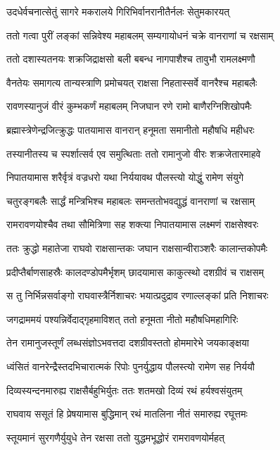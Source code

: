 \twolineshloka
{उदधेर्वचनात्सेतुं सागरे मकरालये}
{गिरिभिर्वानरानीतैर्नलः सेतुमकारयत्}%

\twolineshloka
{ततो गत्वा पुरीं लङ्कां सन्निवेश्य महाबलम्}
{सम्यगायोधनं चक्रे वानराणां च रक्षसाम्}%

\twolineshloka
{ततो दशास्यतनयः शक्रजिद्राक्षसो बली}
{बबन्ध नागपाशैश्च तावुभौ रामलक्ष्मणौ}%

\twolineshloka
{वैनतेयः समागत्य तान्यस्त्राणि प्रमोचयत्}
{राक्षसा निहतास्सर्वे वानरैश्च महाबलैः}%

\twolineshloka
{रावणस्यानुजं वीरं कुम्भकर्णं महाबलम्}
{निजघान रणे रामो बाणैरग्निशिखोपमैः}%

\twolineshloka
{ब्रह्मास्त्रेणेन्द्रजित्क्रुद्धः पातयामास वानरान्}
{हनूमता समानीतो महौषधि महीधरः}%

\twolineshloka
{तस्यानीतस्य च स्पर्शात्सर्व एव समुत्थिताः}
{ततो रामानुजो वीरः शक्रजेतारमाहवे}%

\twolineshloka
{निपातयामास शरैर्वृत्रं वज्रधरो यथा}
{निर्ययावथ पौलस्त्यो योद्धुं रामेण संयुगे}%

\twolineshloka
{चतुरङ्गबलैः सार्द्धं मन्त्रिभिश्च महाबलः}
{समन्ततोभवद्युद्धं वानराणां च रक्षसाम्}%

\twolineshloka
{रामरावणयोश्चैव तथा सौमित्रिणा सह}
{शक्त्या निपातयामास लक्ष्मणं राक्षसेश्वरः}%

\twolineshloka
{ततः क्रुद्धो महातेजा राघवो राक्षसान्तकः}
{जघान राक्षसान्वीराञ्शरैः कालान्तकोपमैः}%

\twolineshloka
{प्रदीप्तैर्बाणसाहस्रैः कालदण्डोपमैर्भृशम्}
{छादयामास काकुत्स्थो दशग्रीवं च राक्षसम्}%

\twolineshloka
{स तु निर्भिन्नसर्वाङ्गो राघवास्त्रैर्निशाचरः}
{भयात्प्रदुद्राव रणाल्लङ्कां प्रति निशाचरः}%

\twolineshloka
{जगद्राममयं पश्यन्निर्वेदाद्गृहमाविशत्}
{ततो हनूमता नीतो महौषधिमहागिरिः}%

\twolineshloka
{तेन रामानुजस्तूर्णं लब्धसंज्ञोऽभवत्तदा}
{दशग्रीवस्ततो होममारेभे जयकाङ्क्षया}%

\twolineshloka
{ध्वंसितं वानरेन्द्रैस्तदभिचारात्मकं रिपोः}
{पुनर्युद्धाय पौलस्त्यो रामेण सह निर्ययौ}%

\twolineshloka
{दिव्यस्यन्दनमारुह्य राक्षसैर्बहुभिर्युतः}
{ततः शतमखो दिव्यं रथं हर्यश्वसंयुतम्}%

\twolineshloka
{राघवाय ससूतं हि प्रेषयामास बुद्धिमान्}
{रथं मातलिना नीतं समारुह्य रघूत्तमः}%

\twolineshloka
{स्तूयमानं सुरगणैर्युयुधे तेन रक्षसा}
{ततो युद्धमभूद्धोरं रामरावणयोर्महत्}%

